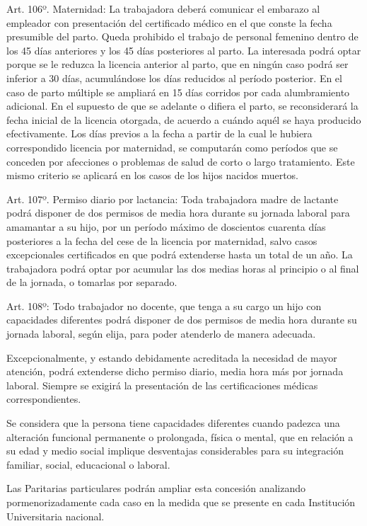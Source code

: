 \documentclass[]{article}
\begin{document}
Art. 106º. Maternidad: La trabajadora deberá comunicar el embarazo al
empleador con presentación del certificado médico en el que conste la
fecha presumible del parto. Queda prohibido el trabajo de personal
femenino dentro de los 45 días anteriores y los 45 días posteriores al
parto. La interesada podrá optar porque se le reduzca la licencia
anterior al parto, que en ningún caso podrá ser inferior a 30 días,
acumulándose los días reducidos al período posterior. En el caso de
parto múltiple se ampliará en 15 días corridos por cada alumbramiento
adicional. En el supuesto de que se adelante o difiera el parto, se
reconsiderará la fecha inicial de la licencia otorgada, de acuerdo a
cuándo aquél se haya producido efectivamente. Los días previos a la
fecha a partir de la cual le hubiera correspondido licencia por
maternidad, se computarán como períodos que se conceden por afecciones o
problemas de salud de corto o largo tratamiento. Este mismo criterio se
aplicará en los casos de los hijos nacidos muertos.

Art. 107º. Permiso diario por lactancia: Toda trabajadora madre de
lactante podrá disponer de dos permisos de media hora durante su jornada
laboral para amamantar a su hijo, por un período máximo de doscientos
cuarenta días posteriores a la fecha del cese de la licencia por
maternidad, salvo casos excepcionales certificados en que podrá
extenderse hasta un total de un año. La trabajadora podrá optar por
acumular las dos medias horas al principio o al final de la jornada, o
tomarlas por separado.

Art. 108º: Todo trabajador no docente, que tenga a su cargo un hijo con
capacidades diferentes podrá disponer de dos permisos de media hora
durante su jornada laboral, según elija, para poder atenderlo de manera
adecuada.

Excepcionalmente, y estando debidamente acreditada la necesidad de mayor
atención, podrá extenderse dicho permiso diario, media hora más por
jornada laboral. Siempre se exigirá la presentación de las
certificaciones médicas correspondientes.

Se considera que la persona tiene capacidades diferentes cuando padezca
una alteración funcional permanente o prolongada, física o mental, que
en relación a su edad y medio social implique desventajas considerables
para su integración familiar, social, educacional o laboral.

Las Paritarias particulares podrán ampliar esta concesión analizando
pormenorizadamente cada caso en la medida que se presente en cada
Institución Universitaria nacional.
\end{document}
